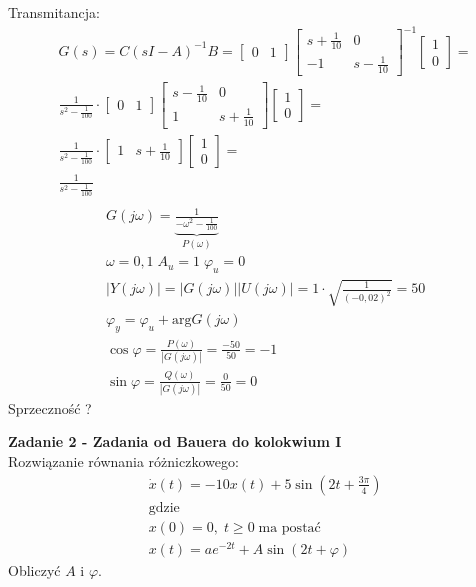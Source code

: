 \documentclass[a4paper,11pt]{article}
\begin{document}
Transmitancja:
\begin{align*}
&G(s)=C(sI-A)^{-1}B=
\begin{bmatrix}
0 & 1 
\end{bmatrix}
\begin{bmatrix}
s+\frac{1}{10} & 0 \\
-1 & s-\frac{1}{10}
\end{bmatrix}^{-1}
\begin{bmatrix}
1 \\
0
\end{bmatrix} = \\
&\frac{1}{s^2-\frac{1}{100}}\cdot 
\begin{bmatrix}
0 & 1 
\end{bmatrix}
\begin{bmatrix}
s-\frac{1}{10} & 0 \\
1 & s+\frac{1}{10}
\end{bmatrix}
\begin{bmatrix}
1 \\
0
\end{bmatrix} = \\
&\frac{1}{s^2-\frac{1}{100}}\cdot 
\begin{bmatrix}
1 & s+\frac{1}{10}
\end{bmatrix}
\begin{bmatrix}
1 \\
0
\end{bmatrix} = \\
&\frac{1}{s^2-\frac{1}{100}} \\
\end{align*}
\begin{align*}
&G(j\omega ) = \underbrace{\frac{1}{-\omega ^{2}-\frac{1}{100}}}_{P(\omega)} \\
&\omega = 0,1 \; A_u=1 \; \varphi _u = 0 \\
&|Y(j\omega)|=|G(j\omega)||U(j\omega)|=1 \cdot \sqrt{\frac{1}{(-0,02)^2}}=50 \\
&\varphi _y = \varphi _u + \text{arg}G(j\omega) \\
&\cos \varphi = \frac{P(\omega)}{|G(j\omega)|} = \frac{-50}{50}=-1 \\
&\sin \varphi = \frac{Q(\omega)}{|G(j\omega)|} = \frac{0}{50} = 0
\end{align*}
Sprzeczność ? 
\newpage
\begin{framed}
\textbf{Zadanie 2 - Zadania od Bauera do kolokwium I } \\ 
Rozwiązanie równania różniczkowego: 
\begin{align*}
&\dot{x}(t)=-10x(t)+5\sin (2t+\frac{3\pi}{4}) \\
&\text{gdzie} \\
&x(0)=0, \; t \geq 0 \; \text{ma postać} \\
&x(t)=ae^{-2t}+A\sin (2t+\varphi)
\end{align*}
Obliczyć \( A \) i \( \varphi \).
\end{framed}
\end{document}
